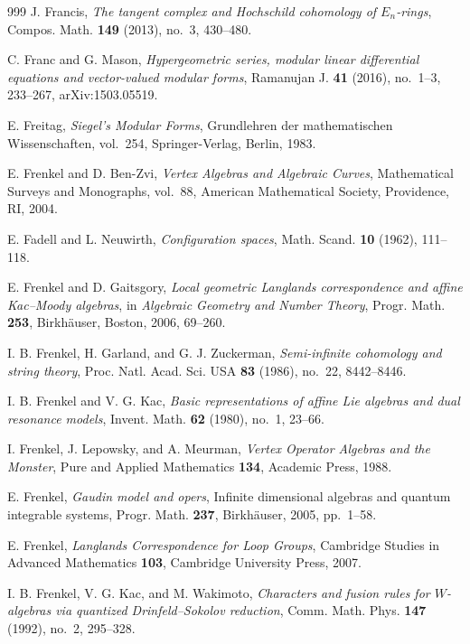 \begin{thebibliography}{999}
J. Francis, \emph{The tangent complex and Hochschild cohomology of $E_n$-rings}, Compos. Math. \textbf{149} (2013), no.~3, 430--480.

C. Franc and G. Mason, \emph{Hypergeometric series, modular linear differential equations and vector-valued modular forms}, Ramanujan J. \textbf{41} (2016), no.~1--3, 233--267, arXiv:1503.05519.

E. Freitag, \emph{Siegel's Modular Forms}, Grundlehren der mathematischen Wissenschaften, vol.~254, Springer-Verlag, Berlin, 1983.

E. Frenkel and D. Ben-Zvi, \emph{Vertex Algebras and Algebraic Curves}, Mathematical Surveys and Monographs, vol.~88, American Mathematical Society, Providence, RI, 2004.

E. Fadell and L. Neuwirth, \emph{Configuration spaces}, Math. Scand. \textbf{10} (1962), 111--118.

E. Frenkel and D. Gaitsgory, \emph{Local geometric Langlands correspondence and affine Kac--Moody algebras}, in \emph{Algebraic Geometry and Number Theory}, Progr. Math. \textbf{253}, Birkh\"auser, Boston, 2006, 69--260.

I. B. Frenkel, H. Garland, and G. J. Zuckerman, \emph{Semi-infinite cohomology and string theory}, Proc. Natl. Acad. Sci. USA \textbf{83} (1986), no.~22, 8442--8446.

I. B. Frenkel and V. G. Kac, \emph{Basic representations of affine Lie algebras and dual resonance models}, Invent. Math. \textbf{62} (1980), no.~1, 23--66.

I. Frenkel, J. Lepowsky, and A. Meurman, \emph{Vertex Operator Algebras and the Monster}, Pure and Applied Mathematics \textbf{134}, Academic Press, 1988.

E. Frenkel, \emph{Gaudin model and opers}, Infinite dimensional algebras and quantum integrable systems, Progr. Math. \textbf{237}, Birkh\"auser, 2005, pp.~1--58.

E. Frenkel, \emph{Langlands Correspondence for Loop Groups}, Cambridge Studies in Advanced Mathematics \textbf{103}, Cambridge University Press, 2007.

I. B. Frenkel, V. G. Kac, and M. Wakimoto, \emph{Characters and fusion rules for $W$-algebras via quantized Drinfeld--Sokolov reduction}, Comm. Math. Phys. \textbf{147} (1992), no.~2, 295--328.


\end{thebibliography}
